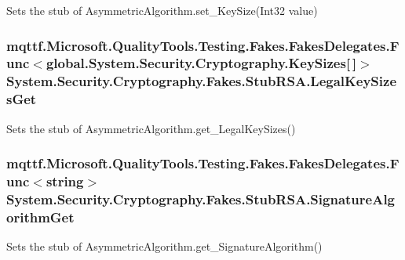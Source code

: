 Sets the stub of Asymmetric\-Algorithm.\-set\-\_\-\-Key\-Size(\-Int32 value)

\hypertarget{class_system_1_1_security_1_1_cryptography_1_1_fakes_1_1_stub_r_s_a_a8c9f5f84d2c109788bf299dd73961fd0}{
\subsubsection[{Legal\-Key\-Sizes\-Get}]{\setlength{\rightskip}{0pt plus 5cm}mqttf.\-Microsoft.\-Quality\-Tools.\-Testing.\-Fakes.\-Fakes\-Delegates.\-Func$<$global.\-System.\-Security.\-Cryptography.\-Key\-Sizes\mbox{[}$\,$\mbox{]}$>$ System.\-Security.\-Cryptography.\-Fakes.\-Stub\-R\-S\-A.\-Legal\-Key\-Sizes\-Get}}\label{class_system_1_1_security_1_1_cryptography_1_1_fakes_1_1_stub_r_s_a_a8c9f5f84d2c109788bf299dd73961fd0}


Sets the stub of Asymmetric\-Algorithm.\-get\-\_\-\-Legal\-Key\-Sizes()

\hypertarget{class_system_1_1_security_1_1_cryptography_1_1_fakes_1_1_stub_r_s_a_a3af04fe823829e9cbae90a66934fb42e}{
\subsubsection[{Signature\-Algorithm\-Get}]{\setlength{\rightskip}{0pt plus 5cm}mqttf.\-Microsoft.\-Quality\-Tools.\-Testing.\-Fakes.\-Fakes\-Delegates.\-Func$<$string$>$ System.\-Security.\-Cryptography.\-Fakes.\-Stub\-R\-S\-A.\-Signature\-Algorithm\-Get}}\label{class_system_1_1_security_1_1_cryptography_1_1_fakes_1_1_stub_r_s_a_a3af04fe823829e9cbae90a66934fb42e}


Sets the stub of Asymmetric\-Algorithm.\-get\-\_\-\-Signature\-Algorithm()

